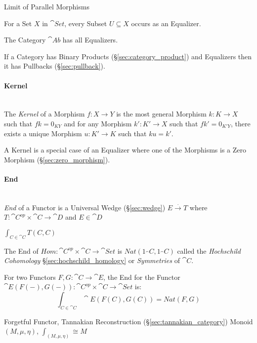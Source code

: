 Limit of Parallel Morphisms

For a Set $X$ in $\cat{Set}$, every Subset $U \subseteq X$ occurs
as an Equalizer.

The Category $\cat{Ab}$ has all Equalizers.

If a Category has Binary Products (\S\ref{sec:category_product}) and
Equalizers then it has Pullbacks (\S\ref{sec:pullback}).



\paragraph{Kernel}\label{sec:morphism_kernel}
\hfill \\

The \emph{Kernel} of a Morphism $f : X \rightarrow Y$ is the most
general Morphism $k : K \rightarrow X$ such that $fk = 0_{KY}$ and for
any Morphism $k' : K' \rightarrow X$ such that $fk' = 0_{K'Y}$, there
exists a unique Morphism $u : K' \rightarrow K$ such that $ku = k'$.

A Kernel is a special case of an Equalizer where one of the Morphisms
is a Zero Morphism (\S\ref{sec:zero_morphism}).



\paragraph{End}\label{sec:end}
\hfill \\

\emph{End} of a Functor is a Universal Wedge (\S\ref{sec:wedge}) $E
\xrightarrow{.} T$ where $T : \cat{C}^{op} \times \cat{C}
\rightarrow \cat{D}$ and $E \in \cat{D}$

$\int_{C \in \cat{C}} T(C,C)$

The End of $Hom : \cat{C}^{op} \times \cat{C} \rightarrow
\cat{Set}$ is $Nat (1_\cat{C},1_\cat{C})$ called the
\emph{Hochschild Cohomology} \S\ref{sec:hochschild_homology} or
\emph{Symmetries} of $\cat{C}$.

For two Functors $F,G : \cat{C} \rightarrow \cat{E}$, the End for
the Functor $\cat{E}(F(-), G(-)) : \cat{C}^{op} \times
\cat{C} \rightarrow \cat{Set}$ is:
\[
  \int_{C \in \cat{C}} \cat{E}(F(C), G(C)) = Nat (F,G)
\]

Forgetful Functor, Tannakian Reconstruction
(\S\ref{sec:tannakian_category}) %
Monoid $(M,\mu,\eta)$, $\int_{(M,\mu,\eta)} \cong M$



